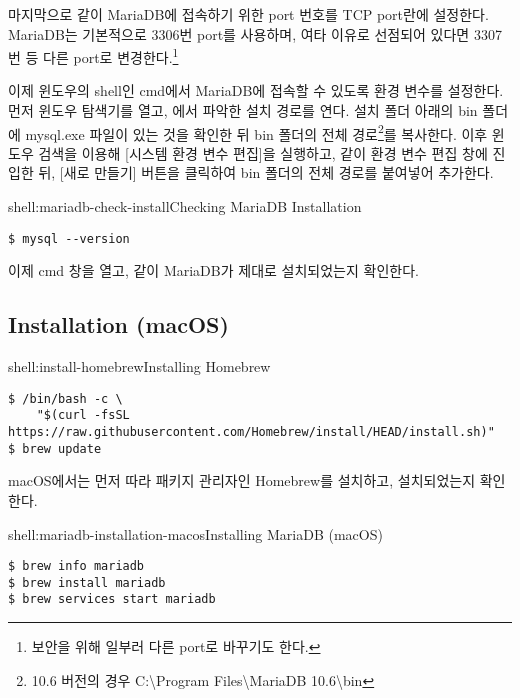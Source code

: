 마지막으로 \와 같이 MariaDB에 접속하기 위한 port 번호를 TCP port란에 설정한다. MariaDB는 기본적으로 3306번 port를 사용하며, 여타 이유로 선점되어 있다면 3307번 등 다른 port로 변경한다.\footnote{보안을 위해 일부러 다른 port로 바꾸기도 한다.}


이제 윈도우의 shell인 cmd에서 MariaDB에 접속할 수 있도록 환경 변수를 설정한다. 먼저 윈도우 탐색기를 열고, 에서 파악한 설치 경로를 연다. 설치 폴더 아래의 bin 폴더에 mysql.exe 파일이 있는 것을 확인한 뒤 bin 폴더의 전체 경로\footnote{10.6 버전의 경우 C:\textbackslash{}Program Files\textbackslash{}MariaDB 10.6\textbackslash{}bin}를 복사한다. 이후 윈도우 검색을 이용해 [시스템 환경 변수 편집]을 실행하고, \과 같이 환경 변수 편집 창에 진입한 뒤, [새로 만들기] 버튼을 클릭하여 bin 폴더의 전체 경로를 붙여넣어 추가한다.

\begin{shellenv}{shell:mariadb-check-install}{Checking MariaDB Installation}\begin{verbatim}
$ mysql --version
\end{verbatim}
\end{shellenv}

이제 cmd 창을 열고, \와 같이 MariaDB가 제대로 설치되었는지 확인한다.

\subsection*{Installation (macOS)}

\begin{shellenv}{shell:install-homebrew}{Installing Homebrew}\begin{verbatim}
$ /bin/bash -c \
    "$(curl -fsSL https://raw.githubusercontent.com/Homebrew/install/HEAD/install.sh)"
$ brew update
\end{verbatim}
\end{shellenv}

macOS에서는 먼저 \를 따라 패키지 관리자인 Homebrew를 설치하고, 설치되었는지 확인한다.

\begin{shellenv}{shell:mariadb-installation-macos}{Installing MariaDB (macOS)}\begin{verbatim}
$ brew info mariadb
$ brew install mariadb
$ brew services start mariadb
\end{verbatim}
\end{shellenv}

